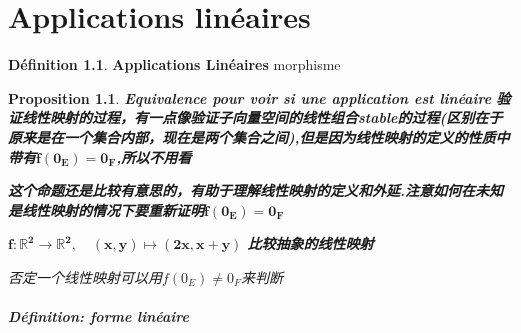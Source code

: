 \documentclass[12pt]{book}
\theoremstyle{definition}\newtheorem{dfn}{Définition}[chapter]
\theoremstyle{plain}\newtheorem{thm}{Théorème}[chapter]
\theoremstyle{plain}\newtheorem{prp}{Proposition}[chapter]
\theoremstyle{plain}\newtheorem{lem}{\bf Lemme}[chapter]
\theoremstyle{plain}\newtheorem{axm}{\bf Axiome}[chapter]
\theoremstyle{plain}\newtheorem{lmm}{\bf Lemme}[chapter]
\theoremstyle{plain}\newtheorem{exm}{\bf Example}[chapter]
\theoremstyle{plain}\newtheorem{cor}{\bf Corollaire}[chapter]
\theoremstyle{remark}\newtheorem{rem}{Remarque}[chapter]
\begin{document}
\chapter{Applications linéaires}
\begin{dfn}{\bf Applications Linéaires}
morphisme
\end{dfn}

\begin{prp}
{\bf Equivalence pour voir si une application  est linéaire}
\textbf{验证线性映射的过程，有一点像验证子向量空间的线性组合stable的过程(区别在于原来是在一个集合内部，现在是两个集合之间),但是因为线性映射的定义的性质中带有$\mathbf{f(0_E)=0_F}$,所以不用看}

\textbf{这个命题还是比较有意思的，有助于理解线性映射的定义和外延.注意如何在未知是线性映射的情况下要重新证明$\mathbf{f(0_E)=0_F}$}

$\mathbf{f:\mathbb{R}^2\longrightarrow \mathbb{R}^2,\quad (x,y)\longmapsto (2x,x+y)} $
\textbf{比较抽象的线性映射}

否定一个线性映射可以用$f(0_E)\neq 0_F$来判断
\end{prp}

\paragraph{Définition: forme linéaire}
\end{document}
